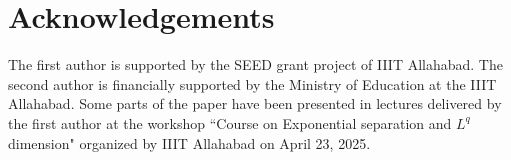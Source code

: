 \documentclass{amsproc}
\newtheorem{theorem}{Theorem}[section]
\theoremstyle{definition}
\theoremstyle{remark}
\numberwithin{equation}{section}
\begin{document}


\section*{Acknowledgements}
 The first author is supported by the SEED grant project of IIIT Allahabad. The second author is financially supported by the Ministry of Education at the IIIT Allahabad. Some parts of the paper have been presented in lectures delivered by the first author at the workshop ``Course on Exponential separation and $L^q$ dimension" organized by IIIT Allahabad on April 23, 2025.
\end{document}
